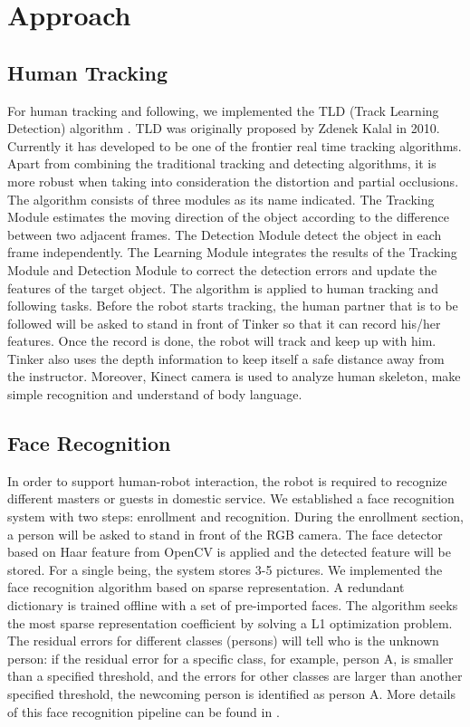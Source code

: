 \documentclass[runningheads,UTF8,fntef,a4paper]{llncs}
\begin{document}
\section{Approach}
\subsection{Human Tracking}
For human tracking and following, we implemented the TLD (Track Learning Detection) algorithm \cite{Kalal}. TLD was originally proposed by Zdenek Kalal in 2010. Currently it has developed to be one of the frontier real time tracking algorithms. Apart from combining the traditional tracking and detecting algorithms, it is more robust when taking into consideration the distortion and partial occlusions. The algorithm consists of three modules as its name indicated. The Tracking Module estimates the moving direction of the object according to the diﬀerence between two adjacent frames. The Detection Module detect the object in each frame independently. The Learning Module integrates the results of the Tracking Module and Detection Module to correct the detection errors and update the features of the target object. The algorithm is applied to human tracking and following tasks. Before the robot starts tracking, the human partner that is to be followed will be asked to stand in front of Tinker so that it can record his/her features. Once the record is done, the robot will track and keep up with him. Tinker also uses the depth information to keep itself a safe distance away from the instructor. Moreover, Kinect camera is used to analyze human skeleton, make simple recognition and understand of body language.

\subsection{Face Recognition}
In order to support human-robot interaction, the robot is required to recognize diﬀerent masters or guests in domestic service. We established a face recognition system with two steps: enrollment and recognition. During the enrollment section, a person will be asked to stand in front of the RGB camera. The face detector based on Haar feature from OpenCV is applied and the detected feature will be stored. For a single being, the system stores 3-5 pictures. We implemented the face recognition algorithm based on sparse representation. A redundant dictionary is trained oﬄine with a set of pre-imported faces. The algorithm seeks the most sparse representation coeﬃcient by solving a L1 optimization problem. The residual errors for diﬀerent classes (persons) will tell who is the unknown person: if the residual error for a specific class, for example, person A, is smaller than a specified threshold, and the errors for other classes are larger than another specified threshold, the newcoming person is identified as person A. More details of this face recognition pipeline can be found in \cite{wright2009robust,xia2015human}.
\end{document}
